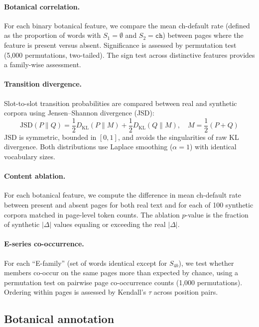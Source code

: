 \documentclass[12pt]{article}
\begin{document}
\paragraph{Botanical correlation.} For each binary botanical feature, we compare the mean ch-default rate (defined as the proportion of words with $S_1 = \emptyset$ and $S_2 = \texttt{ch}$) between pages where the feature is present versus absent. Significance is assessed by permutation test (5,000 permutations, two-tailed). The sign test across distinctive features provides a family-wise assessment.

\paragraph{Transition divergence.} Slot-to-slot transition probabilities are compared between real and synthetic corpora using Jensen--Shannon divergence (JSD):
\begin{equation}
  \text{JSD}(P \| Q) = \frac{1}{2} D_{\text{KL}}(P \| M) + \frac{1}{2} D_{\text{KL}}(Q \| M), \quad M = \frac{1}{2}(P + Q)
  \label{eq:jsd}
\end{equation}
JSD is symmetric, bounded in $[0, 1]$, and avoids the singularities of raw KL divergence. Both distributions use Laplace smoothing ($\alpha = 1$) with identical vocabulary sizes.

\paragraph{Content ablation.} For each botanical feature, we compute the difference in mean ch-default rate between present and absent pages for both real text and for each of 100 synthetic corpora matched in page-level token counts. The ablation $p$-value is the fraction of synthetic $|\Delta|$ values equaling or exceeding the real $|\Delta|$.

\paragraph{E-series co-occurrence.} For each ``E-family'' (set of words identical except for $S_{4b}$), we test whether members co-occur on the same pages more than expected by chance, using a permutation test on pairwise page co-occurrence counts (1,000 permutations). Ordering within pages is assessed by Kendall's $\tau$ across position pairs.

\subsection{Botanical annotation}
\end{document}
